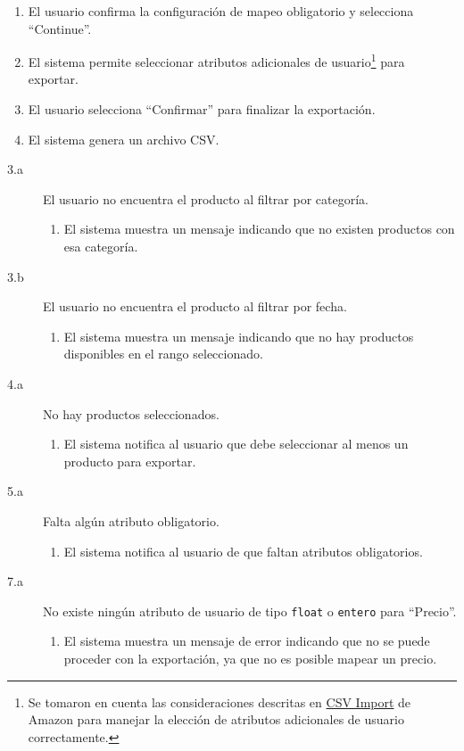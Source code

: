 \begin{enumerate}
    \item El usuario confirma la configuración de mapeo obligatorio y selecciona \enquote{Continue}.
    \item El sistema permite seleccionar atributos adicionales de usuario\footnote{Se tomaron en cuenta las consideraciones descritas en \href{https://buywithprime.amazon.com/knowledge-center/csv-import?utm_medium=website\&utm_source=direct\#standalone-product}{CSV Import} de Amazon para manejar la elección de atributos adicionales de usuario correctamente.} para exportar.
    \item El usuario selecciona \enquote{Confirmar} para finalizar la exportación.
    \item El sistema genera un archivo CSV.
\end{enumerate}

\begin{description}
    \item[3.a] El usuario no encuentra el producto al filtrar por categoría.
    \begin{enumerate}
        \item[3.a.1] El sistema muestra un mensaje indicando que no existen productos con esa categoría.
    \end{enumerate}
    \item[3.b] El usuario no encuentra el producto al filtrar por fecha.
    \begin{enumerate}
        \item[3.b.1] El sistema muestra un mensaje indicando que no hay productos disponibles en el rango seleccionado.
    \end{enumerate}
    \item[4.a] No hay productos seleccionados.
    \begin{enumerate}
        \item[4.a.1] El sistema notifica al usuario que debe seleccionar al menos un producto para exportar.
    \end{enumerate}
    \item[5.a] Falta algún atributo obligatorio.
    \begin{enumerate}
        \item[5.a.1] El sistema notifica al usuario de que faltan atributos obligatorios.
    \end{enumerate}
    \item[7.a] No existe ningún atributo de usuario de tipo \texttt{float} o \texttt{entero} para \enquote{Precio}.
    \begin{enumerate}
        \item[7.a.1] El sistema muestra un mensaje de error indicando que no se puede proceder con la exportación, ya que no es posible mapear un precio.
    \end{enumerate}
\end{description}


